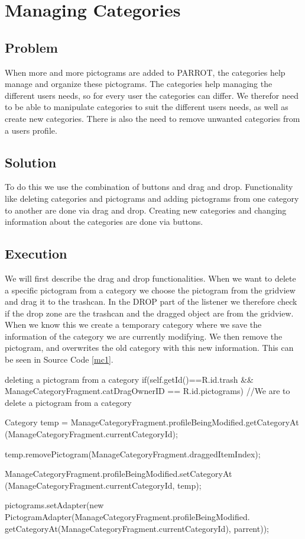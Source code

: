 \section{Managing Categories} %
\subsection*{Problem}
When more and more pictograms are added to PARROT, the categories help manage and organize these pictograms. 
The categories help managing the different users needs, so for every user the categories can differ. 
We therefor need to be able to manipulate categories to suit the different users needs, as well as create new categories. 
There is also the need to remove unwanted categories from a users profile.


\subsection*{Solution}
To do this we use the combination of buttons and drag and drop. 
Functionality like deleting categories and pictograms and adding pictograms from one category to another are done via drag and drop. 
Creating new categories and changing information about the categories are done via buttons. 


\subsection*{Execution}
We will first describe the drag and drop functionalities. 
When we want to delete a specific pictogram from a category we choose the pictogram from the gridview and drag it to the trashcan. 
In the DROP part of the listener we therefore check if the drop zone are the trashcan and the dragged object are from the gridview.
When we know this we create a temporary category where we save the information of the category we are currently modifying. We then remove the pictogram, and overwrites the old category with this new information.
This can be seen in Source Code \ref{mc1}.

\begin{source}[{mc1}]{deleting a pictogram from a category}
if(self.getId()==R.id.trash && ManageCategoryFragment.catDragOwnerID == R.id.pictograms) //We are to delete a pictogram from a category
				{
					Category temp = ManageCategoryFragment.profileBeingModified.getCategoryAt
						(ManageCategoryFragment.currentCategoryId);
					
					temp.removePictogram(ManageCategoryFragment.draggedItemIndex);
					
					ManageCategoryFragment.profileBeingModified.setCategoryAt
						(ManageCategoryFragment.currentCategoryId, temp);
					
					pictograms.setAdapter(new PictogramAdapter(ManageCategoryFragment.profileBeingModified.
						getCategoryAt(ManageCategoryFragment.currentCategoryId), parrent));
				}
\end{source}

